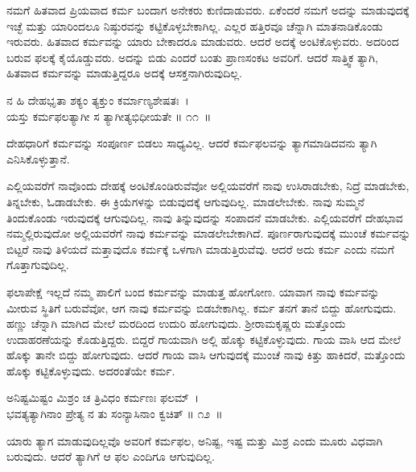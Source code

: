 ನಮಗೆ ಹಿತವಾದ ಪ್ರಿಯವಾದ ಕರ್ಮ ಬಂದಾಗ ಅನೇಕರು ಕುಣಿದಾಡುವರು. ಏಕೆಂದರೆ ನಮಗೆ ಅದನ್ನು ಮಾಡುವುದಕ್ಕೆ ಇಚ್ಛೆ ಮತ್ತು ಯಾರಿಂದಲೂ ನಿಷ್ಠುರವನ್ನು ಕಟ್ಟಿಕೊಳ್ಳಬೇಕಾಗಿಲ್ಲ. ಎಲ್ಲರ ಹತ್ತಿರವೂ ಚೆನ್ನಾಗಿ ಮಾತನಾಡಿಕೊಂಡು ಇರುವರು. ಹಿತವಾದ ಕರ್ಮವನ್ನು ಯಾರು ಬೇಕಾದರೂ ಮಾಡುವರು. ಆದರೆ ಅದಕ್ಕೆ ಅಂಟಿಕೊಳ್ಳುವರು. ಅದರಿಂದ ಬರುವ ಫಲಕ್ಕೆ ಕೈಯೊಡ್ಡುವರು. ಅದನ್ನು ಬಿಡು ಎಂದರೆ ಬಂತು ಪ್ರಾಣಸಂಕಟ ಅವರಿಗೆ. ಆದರೆ ಸಾತ್ತ್ವಿಕ ತ್ಯಾಗಿ, ಹಿತವಾದ ಕರ್ಮವನ್ನು ಮಾಡುತ್ತಿದ್ದರೂ ಅದಕ್ಕೆ ಆಸಕ್ತನಾಗಿರುವುದಿಲ್ಲ.

\begin{shloka}
ನ ಹಿ ದೇಹಭೃತಾ ಶಕ್ಯಂ ತ್ಯಕ್ತುಂ ಕರ್ಮಾಣ್ಯಶೇಷತಃ~।\\ಯಸ್ತು ಕರ್ಮಫಲತ್ಯಾಗೀ ಸ ತ್ಯಾಗೀತ್ಯಭಿಧೀಯತೇ \hfill॥ ೧೧~॥
\end{shloka}

\newpage

\begin{artha}
ದೇಹಧಾರಿಗೆ ಕರ್ಮವನ್ನು ಸಂಪೂರ್ಣ ಬಿಡಲು ಸಾಧ್ಯವಿಲ್ಲ. ಆದರೆ ಕರ್ಮಫಲವನ್ನು ತ್ಯಾಗ\-ಮಾಡಿದವನು ತ್ಯಾಗಿ ಎನಿಸಿಕೊಳ್ಳುತ್ತಾನೆ.
\end{artha}

ಎಲ್ಲಿಯವರೆಗೆ ನಾವೊಂದು ದೇಹಕ್ಕೆ ಅಂಟಿಕೊಂಡಿರುವೆವೋ ಅಲ್ಲಿಯವರೆಗೆ ನಾವು ಉಸಿರಾಡಬೇಕು, ನಿದ್ರೆ ಮಾಡಬೇಕು, ತಿನ್ನಬೇಕು, ಓಡಾಡಬೇಕು. ಈ ಕ್ರಿಯೆಗಳನ್ನು ಬಿಡುವುದಕ್ಕೆ ಆಗುವುದಿಲ್ಲ. ಮಾಡಲೇಬೇಕು. ನಾವು ಸುಮ್ಮನೆ ತಿಂದುಕೊಂಡು ಇರುವುದಕ್ಕೆ ಆಗುವುದಿಲ್ಲ. ನಾವು ತಿನ್ನುವುದನ್ನು ಸಂಪಾದನೆ ಮಾಡಬೇಕು. ಎಲ್ಲಿಯವರೆಗೆ ದೇಹಭಾವ ನಮ್ಮಲ್ಲಿರುವುದೋ ಅಲ್ಲಿಯವರೆಗೆ ನಾವು ಕರ್ಮವನ್ನು ಮಾಡಲೇಬೇಕಾಗಿದೆ. ಪೂರ್ಣರಾಗುವುದಕ್ಕೆ ಮುಂಚೆ ಕರ್ಮವನ್ನು ಬಿಟ್ಟರೆ ನಾವು ತಿಳಿಯದೆ ಮತ್ತಾವುದೊ ಕರ್ಮಕ್ಕೆ ಒಳಗಾಗಿ ಮಾಡುತ್ತಿರುವೆವು. ಆದರೆ ಅದು ಕರ್ಮ ಎಂದು ನಮಗೆ ಗೊತ್ತಾಗುವುದಿಲ್ಲ.

ಫಲಾಪೇಕ್ಷೆ ಇಲ್ಲದೆ ನಮ್ಮ ಪಾಲಿಗೆ ಬಂದ ಕರ್ಮವನ್ನು ಮಾಡುತ್ತ ಹೋಗೋಣ. ಯಾವಾಗ ನಾವು ಕರ್ಮವನ್ನು ಮೀರುವ ಸ್ಥಿತಿಗೆ ಬರುವೆವೋ, ಆಗ ನಾವು ಕರ್ಮವನ್ನು ಬಿಡಬೇಕಾಗಿಲ್ಲ. ಕರ್ಮ ತನಗೆ ತಾನೆ ಬಿದ್ದು ಹೋಗುವುದು. ಹಣ್ಣು ಚೆನ್ನಾಗಿ ಮಾಗಿದ ಮೇಲೆ ಮರದಿಂದ ಉದುರಿ ಹೋಗುವುದು. ಶ‍್ರೀರಾಮಕೃಷ್ಣರು ಮತ್ತೊಂದು ಉದಾಹರಣೆಯನ್ನು ಕೊಡುತ್ತಿದ್ದರು. ಬಿದ್ದರೆ ಗಾಯವಾಗಿ ಅಲ್ಲಿ ಹೊಕ್ಕು ಕಟ್ಟಿಕೊಳ್ಳುವುದು. ಗಾಯ ವಾಸಿ ಆದ ಮೇಲೆ ಹೊಕ್ಕು ತಾನೇ ಬಿದ್ದು ಹೋಗುವುದು. ಆದರೆ ಗಾಯ ವಾಸಿ ಆಗುವುದಕ್ಕೆ ಮುಂಚೆ ನಾವು ಕಿತ್ತು ಹಾಕಿದರೆ, ಮತ್ತೊಂದು ಹೊಕ್ಕು ಕಟ್ಟಿಕೊಳ್ಳುವುದು. ಅದರಂತೆಯೇ ಕರ್ಮ.

\begin{shloka}
ಅನಿಷ್ಟಮಿಷ್ಟಂ ಮಿಶ್ರಂ ಚ ತ್ರಿವಿಧಂ ಕರ್ಮಣಃ ಫಲಮ್~।\\ಭವತ್ಯತ್ಯಾಗಿನಾಂ ಪ್ರೇತ್ಯ ನ ತು ಸಂನ್ಯಾಸಿನಾಂ ಕ್ವಚಿತ್ \hfill॥ ೧೨~॥
\end{shloka}

\begin{artha}
ಯಾರು ತ್ಯಾಗ ಮಾಡುವುದಿಲ್ಲವೊ ಅವರಿಗೆ ಕರ್ಮಫಲ, ಅನಿಷ್ಟ, ಇಷ್ಟ ಮತ್ತು ಮಿಶ್ರ ಎಂದು ಮೂರು ವಿಧವಾಗಿ ಬರುವುದು. ಆದರೆ ತ್ಯಾಗಿಗೆ ಆ ಫಲ ಎಂದಿಗೂ ಆಗುವುದಿಲ್ಲ.
\end{artha}

